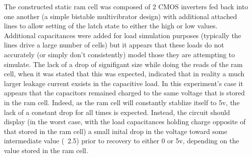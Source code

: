 \documentclass[10pt]{article}
\begin{document}
The constructed static ram cell was composed of 2 CMOS inverters fed back into
one another (a simple bistable multivibrator design) with additional
attached lines to allow setting of the latch state to either the high or
low values. Additional capacitances were added for load simulation
purposes (typically the lines drive a large number of cells) but it
appears that these loads do not accurately (or simply don't consistently)
model those they are attempting to simulate. The lack of a drop of
signifigant size while doing the reads of the ram cell, when it was stated
that this was expected, indicated that in reality a much larger leakage
current exsists in the capacitive load. In this experiment's case it
appears that the capacitors remained charged to the same voltage that is
stored in the ram cell. Indeed, as the ram cell will constantly stablize
itself to 5v, the lack of a constant drop for all times is expected.
Instead, the circuit should display (in the worst case, with the load
capacitances holding charge opposite of that stored in the ram cell) a
small inital drop in the voltage toward some intermediate value (~2.5)
prior to recovery to either 0 or 5v, depending on the value stored in the
ram cell.

%
\end{document}
